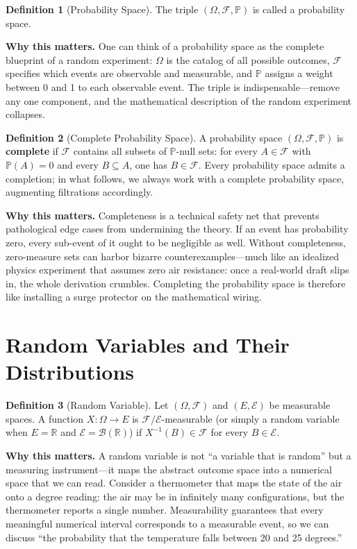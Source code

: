 \documentclass[11pt,a4paper,openany]{book}
\theoremstyle{definition}
\newtheorem{definition}{Definition}[chapter]
\theoremstyle{plain}
\theoremstyle{remark}
\newcommand{\1}{\mathbbm{1}}
\newcommand{\R}{\mathbb{R}}
\newcommand{\F}{\mathcal{F}}
\newcommand{\B}{\mathcal{B}}
\newcommand{\Pbb}{\mathbb{P}}
\newcommand{\calE}{\mathcal{E}}
\begin{document}
\begin{definition}[Probability Space]
The triple $(\Omega, \F, \Pbb)$ is called a probability space.
\end{definition}

\medskip
\noindent\textbf{Why this matters.} One can think of a probability space as the complete blueprint of a random experiment: $\Omega$ is the catalog of all possible outcomes, $\mathcal{F}$ specifies which events are observable and measurable, and $\mathbb{P}$ assigns a weight between 0 and 1 to each observable event. The triple is indispensable---remove any one component, and the mathematical description of the random experiment collapses.

\begin{definition}[Complete Probability Space]
A probability space $(\Omega, \F, \Pbb)$ is \textbf{complete} if $\F$ contains all subsets of $\Pbb$-null sets: for every $A \in \F$ with $\Pbb(A) = 0$ and every $B \subseteq A$, one has $B \in \F$. Every probability space admits a completion; in what follows, we always work with a complete probability space, augmenting filtrations accordingly.
\end{definition}

\medskip
\noindent\textbf{Why this matters.} Completeness is a technical safety net that prevents pathological edge cases from undermining the theory. If an event has probability zero, every sub-event of it ought to be negligible as well. Without completeness, zero-measure sets can harbor bizarre counterexamples---much like an idealized physics experiment that assumes zero air resistance: once a real-world draft slips in, the whole derivation crumbles. Completing the probability space is therefore like installing a surge protector on the mathematical wiring.

\section{Random Variables and Their Distributions}

\begin{definition}[Random Variable]
Let $(\Omega, \F)$ and $(E, \calE)$ be measurable spaces. A function $X: \Omega \to E$ is $\F/\calE$-measurable (or simply a random variable when $E = \R$ and $\calE = \B(\R)$) if $X^{-1}(B) \in \F$ for every $B \in \calE$.
\end{definition}

\medskip
\noindent\textbf{Why this matters.} A random variable is not ``a variable that is random'' but a measuring instrument---it maps the abstract outcome space into a numerical space that we can read. Consider a thermometer that maps the state of the air onto a degree reading: the air may be in infinitely many configurations, but the thermometer reports a single number. Measurability guarantees that every meaningful numerical interval corresponds to a measurable event, so we can discuss ``the probability that the temperature falls between 20 and 25 degrees.''
\end{document}
